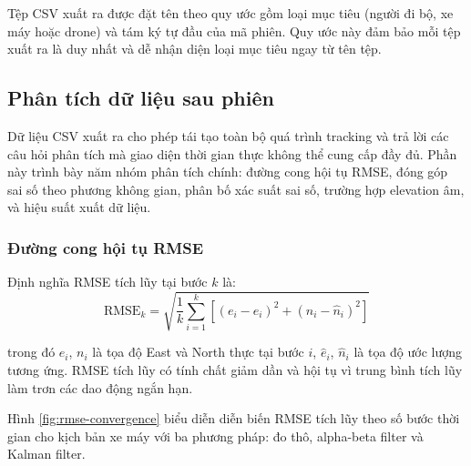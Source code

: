 \hspace{0.5cm} Tệp CSV xuất ra được đặt tên theo quy ước gồm loại mục tiêu (người đi bộ, xe máy hoặc drone) và tám ký tự đầu của mã phiên. Quy ước này đảm bảo mỗi tệp xuất ra là duy nhất và dễ nhận diện loại mục tiêu ngay từ tên tệp.

\subsection{Phân tích dữ liệu sau phiên}

\hspace{0.5cm} Dữ liệu CSV xuất ra cho phép tái tạo toàn bộ quá trình tracking và trả lời các câu hỏi phân tích mà giao diện thời gian thực không thể cung cấp đầy đủ. Phần này trình bày năm nhóm phân tích chính: đường cong hội tụ RMSE, đóng góp sai số theo phương không gian, phân bố xác suất sai số, trường hợp elevation âm, và hiệu suất xuất dữ liệu.

\subsubsection{Đường cong hội tụ RMSE}

\hspace{0.5cm} Định nghĩa RMSE tích lũy tại bước $k$ là:
\begin{equation}
\text{RMSE}_k = \sqrt{\frac{1}{k} \sum_{i=1}^{k} \left[(e_i - \hat{e}_i)^2 + (n_i - \hat{n}_i)^2\right]}
\label{eq:rmse-cumulative}
\end{equation}

trong đó $e_i$, $n_i$ là tọa độ East và North thực tại bước $i$, $\hat{e}_i$, $\hat{n}_i$ là tọa độ ước lượng tương ứng. RMSE tích lũy có tính chất giảm dần và hội tụ vì trung bình tích lũy làm trơn các dao động ngắn hạn.

Hình \ref{fig:rmse-convergence} biểu diễn diễn biến RMSE tích lũy theo số bước thời gian cho kịch bản xe máy với ba phương pháp: đo thô, alpha-beta filter và Kalman filter.

